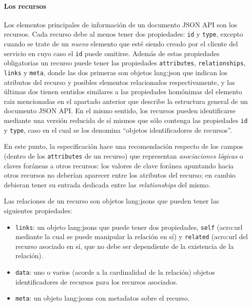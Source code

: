 \paragraph{Los recursos}

Los elementos principales de información de un documento JSON API son los recursos. Cada recurso debe al menos tener dos propiedades: \texttt{id} y \texttt{type}, excepto cuando se trate de un \textit{nuevo} elemento que esté siendo creado por el cliente del servicio en cuyo caso el \texttt{id} puede omitirse. Además de estas propiedades obligatorias un recurso puede tener las propiedades \texttt{attributes}, \texttt{relationships}, \texttt{links} y \texttt{meta}, donde las dos primeras son objetos \gls{lang:json} que indican los atributos del recurso y posibles elementos relacionados respectivamente, y las últimas dos tienen sentidos similares a las propiedades homónimas del elemento raiz mencionadas en el apartado anterior que describe la estructura general de un documento JSON API. En el mismo sentido, los recursos pueden identificarse mediante una versión reducida de sí mismos que sólo contenga las propiedades \texttt{id} y \texttt{type}, caso en el cual se los denomina ``objetos identificadores de recursos''.

En este punto, la especificación hace una recomendación respecto de los campos (dentro de los \texttt{attributes} de un recurso) que representan \textit{asociaciones lógicas} o claves foráneas a otros recursos: los valores de clave foránea apuntando hacia otros recursos no deberían aparecer entre los atributos del recurso; en cambio debieran tener su entrada dedicada entre las \textit{relationships} del mismo.

Las relaciones de un recurso son objetos \glspl{lang:json} que pueden tener las siguientes propiedades:

\begin{itemize}
  \item \texttt{links}: un objeto \glspl{lang:json} que puede tener dos propiedades, \texttt{self} (\gls{acro:url} mediante la cual se puede manipular la relación en sí) y \texttt{related} (\gls{acro:url} del recurso asociado en sí, que no debe ser dependiente de la existencia de la relación).
  \item \texttt{data}: uno o varios (acorde a la cardinalidad de la relación) objetos identificadores de recursos para los recursos asociados.
  \item \texttt{meta}: un objeto \glspl{lang:json} con metadatos sobre el recurso.
\end{itemize}

